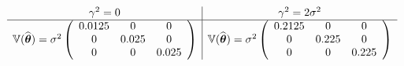 \documentclass[dvips, lscape]{foils}
\newcommand{\thetabf}{\mbox{\mathversion{bold}{$\theta$}}}
\newcommand{\Var}{{\mathbb V}}
\newcommand{\textblue}[1]{\textcolor{blue}{#1}}
\newcommand{\subsection}[1]{
  \addtocounter{subsection}{1}
  {\noindent{\textblue{\large #1}}}
  }
\newcommand{\paragraph}[1]{\noindent{\textblue{#1}}}
\begin{document}
\newpage
\subsection{Variance of the estimates}

\vspace{-0.5cm}
\paragraph{2 scenarios.} 
$$
  \begin{array}{c|c}
    \gamma^2 = 0 & \gamma^2 = 2 \sigma^2 \\
    \hline
    \Var(\widehat{\thetabf}) = \sigma^2 \left( 
      \begin{array}{ccc}
        0.0125  &          0   &         0 \\
        0  &      0.025   &         0 \\
        0  &          0   &     0.025 \\
      \end{array}    
    \right)
    & 
    \Var(\widehat{\thetabf}) = \sigma^2 \left( 
      \begin{array}{ccc}
        0.2125 & 0 & 0 \\
        0 & 0.225 & 0 \\
        0 & 0 & 0.225 \\
      \end{array}
    \right)
  \end{array}
$$
\end{document}
